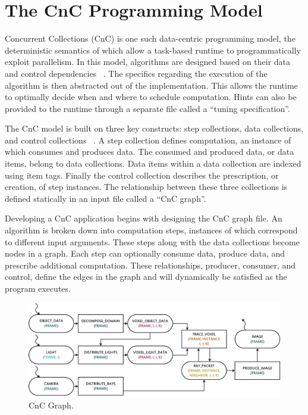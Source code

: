 \section{The CnC Programming Model}

Concurrent Collections (CnC) is one such data-centric programming
model, the deterministic semantics of which allow a task-based runtime
to programmatically exploit parallelism. In this model, algorithms are
designed based on their data and control dependencies
~\cite{budimlicconcurrent}. The specifics regarding the execution of
the algorithm is then abstracted out of the implementation. This
allows the runtime to optimally decide when and where to schedule
computation. Hints can also be provided to the runtime through a
separate file called a ``tuning specification''.

The CnC model is built on three key constructs: step collections, data collections, and control collections ~\cite{budimlicconcurrent}.  A step collection defines computation, an instance of which consumes and produces data.  The consumed and produced data, or data items, belong to data collections.  Data items within a data collection are indexed using item tags.
Finally the control collection describes the prescription, or creation, of step instances.  The relationship between these three collections is defined statically in an input file called a ``CnC graph''.

Developing a CnC application begins with designing the CnC graph file.  An algorithm is broken down into computation steps, instances of which correspond to different input arguments.  These steps along with the data collections become nodes in a graph.  Each step can optionally consume data, produce data, and prescribe additional computation.  These relationships, producer, consumer, and control, define the edges in the graph and will dynamically be satisfied as the program executes.

\begin{figure}[!htb]
  \centering
  \includegraphics[width=\textwidth]{drawings/CnC.pdf}
  \caption{CnC Graph.}
  \label{fig:cnc}
\end{figure}

